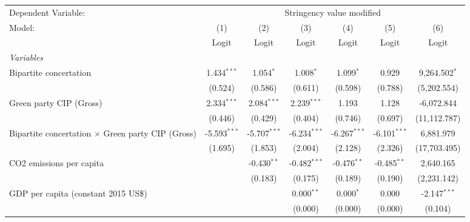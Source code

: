 
\begingroup
\centering
\begin{tabular}{lcccccc}
   \toprule
   Dependent Variable: & \multicolumn{6}{c}{Stringency value modified}\\
   Model:                                                   & (1)            & (2)            & (3)            & (4)            & (5)            & (6)\\  
                                                            &  Logit         & Logit          & Logit          & Logit          & Logit          & Logit\\  
   \midrule
   \emph{Variables}\\
   Bipartite concertation                                   & 1.434$^{***}$  & 1.054$^{*}$    & 1.008$^{*}$    & 1.099$^{*}$    & 0.929          & 9,264.502$^{*}$\\   
                                                            & (0.524)        & (0.586)        & (0.611)        & (0.598)        & (0.788)        & (5,202.554)\\   
   Green party CIP (Gross)                                  & 2.334$^{***}$  & 2.084$^{***}$  & 2.239$^{***}$  & 1.193          & 1.128          & -6,072.844\\   
                                                            & (0.446)        & (0.429)        & (0.404)        & (0.746)        & (0.697)        & (11,112.787)\\   
   Bipartite concertation $\times$ Green party CIP (Gross)  & -5.593$^{***}$ & -5.707$^{***}$ & -6.234$^{***}$ & -6.267$^{***}$ & -6.101$^{***}$ & 6,881.979\\   
                                                            & (1.695)        & (1.853)        & (2.004)        & (2.128)        & (2.326)        & (17,703.495)\\   
   CO2 emissions per capita                                 &                & -0.430$^{**}$  & -0.482$^{***}$ & -0.476$^{**}$  & -0.485$^{**}$  & 2,640.165\\   
                                                            &                & (0.183)        & (0.175)        & (0.189)        & (0.190)        & (2,231.142)\\   
   GDP per capita (constant 2015 US\$)                      &                &                & 0.000$^{**}$   & 0.000$^{*}$    & 0.000          & -2.147$^{***}$\\   
                                                            &                &                & (0.000)        & (0.000)        & (0.000)        & (0.104)\\   

\end{tabular}
